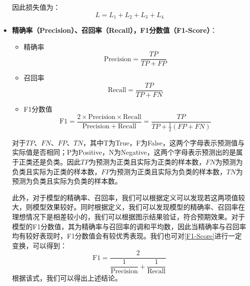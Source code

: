 \documentclass{MathorCupmodeling}
\begin{document}
\begin{itemize}
\begin{itemize}
			\end{itemize}
			因此损失值为：
			\begin{equation}
				L=L_1+L_2+L_3+L_4
			\end{equation}
		\item \textbf{精确率（Precision）、召回率（Recall），F1分数值（F1-Score）}：
		\begin{itemize}
			\item {\heiti 精确率}
			\begin{equation}
				\mathrm{Precision} = \frac{TP}{TP+FP} \label{Precision}
			\end{equation}
			\item {\heiti 召回率}
			\begin{equation}
				\mathrm{Recall} = \frac{TP}{TP+FN} \label{Recall}
			\end{equation}
			\item {\heiti F1分数值} 
			\begin{equation}
				\mathrm{F}1 = \frac{2\times \mathrm{Precision}\times \mathrm{Recall}}{\mathrm{Precision}+\mathrm{Recall}}=\frac{TP}{TP+\frac{1}{2}\left(FP+FN\right)} \label{F1-Score}
			\end{equation}
		\end{itemize}
		对于$TP$、$FN$、$FP$、$TN$，其中T为True，F为False，这两个字母表示预测值与实际值是否相同；P为Positive，N为Negative，这两个字母表示预测出的是属于正类还是负类。因此$TP$为预测为正类且实际为正类的样本数，$FN$为预测为负类且实际为正类的样本数，$FP$为预测为正类且实际为负类的样本数，$TN$为预测为负类且实际为负类的样本数。

		此外，对于模型的精确率、召回率，我们可以根据定义可以发现若这两项值较大，则模型效果较好。同时根据定义，我们可以发现模型的精确率、召回率在理想情况下是相差较小的，我们可以根据图示结果验证，符合预期效果。对于模型的F1分数值，其为精确率与召回率的调和平均数\textcolor{blue}{\cite{模型评测}}，因此当精确率与召回率均有较好表现时，F1分数值会有较优秀表现。我们也可对\textcolor{blue}{\eqref{F1-Score}}进行一定变换，可以得到：
		\begin{equation}
			\mathrm{F}1=\frac{2}{\dfrac{1}{\mathrm{Precision}}+\dfrac{1}{\mathrm{Recall}}} \label{ReacllNew}
		\end{equation}
		根据该式，我们可以得出上述结论。


\end{itemize}
\end{document}
